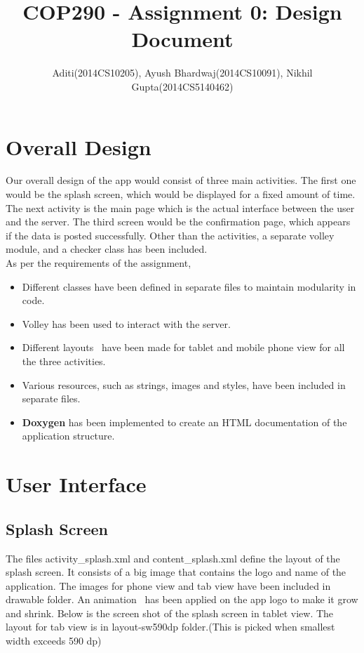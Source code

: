 \documentclass{article}
\begin{document}
\title{COP290 - Assignment 0: Design Document}
\author{ Aditi(2014CS10205), Ayush Bhardwaj(2014CS10091), Nikhil Gupta(2014CS5140462)}

\maketitle

\section{Overall Design}

Our overall design of the app would consist of three main activities. The first one would be the splash screen, which would be displayed for a fixed amount of time. The next activity is the main page which is the actual interface between the user and the server. The third screen would be the confirmation page, which appears if the data is posted successfully. Other than the activities, a separate volley module, and a checker class has been included.\\
As per the requirements of the assignment,
\begin{itemize}
\item Different classes have been defined in separate files to maintain modularity in code.
\item Volley has been used to interact with the server.
\item Different layouts~\cite{multiple_screen_sizes} have been made for tablet and mobile phone view for all the three activities.
\item Various resources, such as strings, images and styles, have been included in separate files.
\item \textbf{Doxygen} has been implemented to create an HTML documentation of the application structure.
\end{itemize} 

\section{User Interface}
\subsection{Splash Screen} The files activity\_splash.xml and content\_splash.xml define the layout of the splash screen. It consists of a big image that contains the logo and name of the application. The images for phone view and tab view have been included in drawable folder. An animation~\cite{animations} has been applied on the app logo to make it grow and shrink. Below is the screen shot of the splash screen in tablet view. The layout for tab view is in layout-sw590dp folder.(This is picked when smallest width exceeds 590 dp)
\end{document}

